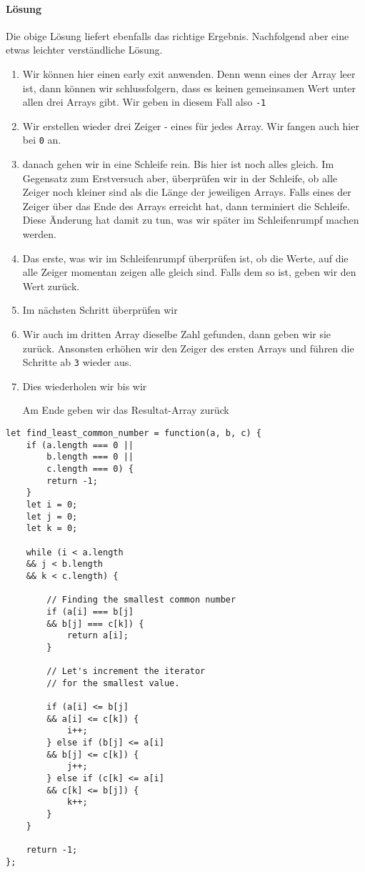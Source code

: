 \documentclass{book}
\begin{document}
\paragraph{Lösung} Die obige Lösung liefert ebenfalls das richtige Ergebnis. Nachfolgend aber eine etwas leichter verständliche Lösung.
\begin{enumerate} 
	\item Wir können hier einen early exit anwenden. Denn wenn eines der Array leer ist, dann können wir schlussfolgern, dass es keinen gemeinsamen Wert unter allen drei Arrays gibt. Wir geben in diesem Fall also \lstinline|-1| 
	\item Wir erstellen wieder drei Zeiger - eines für jedes Array. Wir fangen auch hier bei \lstinline|0| an.
	\item danach gehen wir in eine Schleife rein. Bis hier ist noch alles gleich. Im Gegensatz zum Erstversuch aber, überprüfen wir in der Schleife, ob alle Zeiger noch kleiner sind als die Länge der jeweiligen Arrays. Falls eines der Zeiger über das Ende des Arrays erreicht hat, dann terminiert die Schleife. Diese Änderung hat damit zu tun, was wir später im Schleifenrumpf machen werden.
	\item Das erste, was wir im Schleifenrumpf überprüfen ist, ob die Werte, auf die alle Zeiger momentan zeigen alle gleich sind. Falls dem so ist, geben wir den Wert zurück. 
	\item Im nächsten Schritt überprüfen wir 
	\item Wir auch im dritten Array dieselbe Zahl gefunden, dann geben wir sie zurück. Ansonsten erhöhen wir den Zeiger des ersten Arrays und führen die Schritte ab \lstinline|3| wieder aus.
	\item Dies wiederholen wir bis wir 
	
	Am Ende geben wir das Resultat-Array zurück
\end{enumerate}

\begin{lstlisting}[caption=My Javascript Example]
let find_least_common_number = function(a, b, c) {
	if (a.length === 0 ||
		b.length === 0 ||
		c.length === 0) {
		return -1;
	}
	let i = 0;
	let j = 0;
	let k = 0;

	while (i < a.length
	&& j < b.length 
	&& k < c.length) {
	
		// Finding the smallest common number
		if (a[i] === b[j]
		&& b[j] === c[k]) {
			return a[i];
		}
		
		// Let's increment the iterator
		// for the smallest value.
		
		if (a[i] <= b[j]
		&& a[i] <= c[k]) {
			i++;
		} else if (b[j] <= a[i]
		&& b[j] <= c[k]) {
			j++;
		} else if (c[k] <= a[i]
		&& c[k] <= b[j]) {
			k++;
		}	
	}
	
	return -1;
};
\end{lstlisting}
\end{document}
